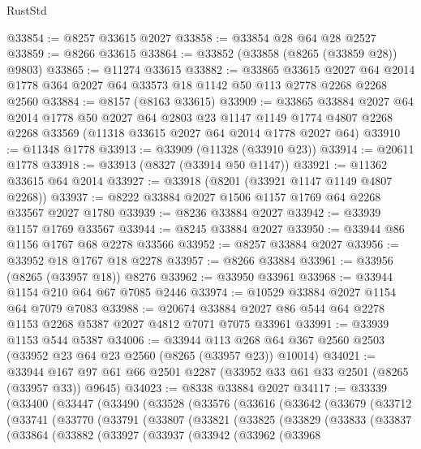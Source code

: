 \begin{lexlean}{RustStd}
\begin{coremodule}
{\begin{coremodule}
{{{{{{{{{{{{{{{{{{{{{{{{{{{{{{{{{{{{{{{{{{{{{{{{{{{{{{@33854 := @8257 @33615 @2027
@33858 := @33854 @28 @64 @28 @2527
@33859 := @8266 @33615
@33864 := @33852 (@33858 (@8265 (@33859 @28)) @9803)
@33865 := @11274 @33615
@33882 := @33865
    @33615
    @2027
    @64
    @2014
    @1778
    @364
    @2027
    @64
    @33573
    @18
    @1142
    @50
    @113
    @2778
    @2268
    @2268
    @2560
@33884 := @8157 (@8163 @33615)
@33909 := @33865
    @33884
    @2027
    @64
    @2014
    @1778
    @50
    @2027
    @64
    @2803
    @23
    @1147
    @1149
    @1774
    @4807
    @2268
    @2268
    @33569
    (@11318 @33615 @2027 @64 @2014 @1778 @2027 @64)
@33910 := @11348 @1778
@33913 := @33909 (@11328 (@33910 @23))
@33914 := @20611 @1778
@33918 := @33913 (@8327 (@33914 @50 @1147))
@33921 := @11362 @33615 @64 @2014
@33927 := @33918 (@8201 (@33921 @1147 @1149 @4807 @2268))
@33937 := @8222 @33884 @2027 @1506 @1157 @1769 @64 @2268 @33567 @2027 @1780
@33939 := @8236 @33884 @2027
@33942 := @33939 @1157 @1769 @33567
@33944 := @8245 @33884 @2027
@33950 := @33944 @86 @1156 @1767 @68 @2278 @33566
@33952 := @8257 @33884 @2027
@33956 := @33952 @18 @1767 @18 @2278
@33957 := @8266 @33884
@33961 := @33956 (@8265 (@33957 @18)) @8276
@33962 := @33950 @33961
@33968 := @33944 @1154 @210 @64 @67 @7085 @2446
@33974 := @10529 @33884 @2027 @1154 @64 @7079 @7083
@33988 := @20674 @33884 @2027 @86 @544 @64 @2278 @1153 @2268 @5387 @2027 @4812 @7071 @7075 @33961
@33991 := @33939 @1153 @544 @5387
@34006 := @33944
    @113
    @268
    @64
    @367
    @2560
    @2503
    (@33952 @23 @64 @23 @2560 (@8265 (@33957 @23)) @10014)
@34021 := @33944 @167 @97 @61 @66 @2501 @2287 (@33952 @33 @61 @33 @2501 (@8265 (@33957 @33)) @9645)
@34023 := @8338 @33884 @2027
@34117 := @33339
    (@33400
      (@33447
        (@33490
          (@33528
            (@33576
              (@33616
                (@33642
                  (@33679
                    (@33712
                      (@33741
                        (@33770
                          (@33791
                            (@33807
                              (@33821
                                (@33825
                                  (@33829
                                    (@33833
                                      (@33837
                                        (@33864
                                          (@33882
                                            (@33927
                                              (@33937
                                                (@33942
                                                  (@33962
                                                    (@33968
}}}}}}}}}}}}}}}}}}}}}}}}}}}}}}}}}}}}}}}}}}}}}}}}}}}}}}
\end{coremodule}}
\end{coremodule}
\end{lexlean}

